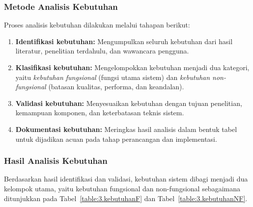 \subsubsection{Metode Analisis Kebutuhan}
Proses analisis kebutuhan dilakukan melalui tahapan berikut:
\begin{enumerate}[noitemsep]
	\item \textbf{Identifikasi kebutuhan:} Mengumpulkan seluruh kebutuhan dari hasil literatur, penelitian terdahulu, dan wawancara pengguna.
	\item \textbf{Klasifikasi kebutuhan:} Mengelompokkan kebutuhan menjadi dua kategori, yaitu \textit{kebutuhan fungsional} (fungsi utama sistem) dan \textit{kebutuhan non-fungsional} (batasan kualitas, performa, dan keandalan).
	\item \textbf{Validasi kebutuhan:} Menyesuaikan kebutuhan dengan tujuan penelitian, kemampuan komponen, dan keterbatasan teknis sistem.
	\item \textbf{Dokumentasi kebutuhan:} Meringkas hasil analisis dalam bentuk tabel untuk dijadikan acuan pada tahap perancangan dan implementasi.
\end{enumerate}

\subsubsection{Hasil Analisis Kebutuhan}
Berdasarkan hasil identifikasi dan validasi, kebutuhan sistem dibagi menjadi dua kelompok utama, yaitu kebutuhan fungsional dan non-fungsional sebagaimana ditunjukkan pada Tabel~\ref{table:3.kebutuhanF} dan Tabel~\ref{table:3.kebutuhanNF}.

